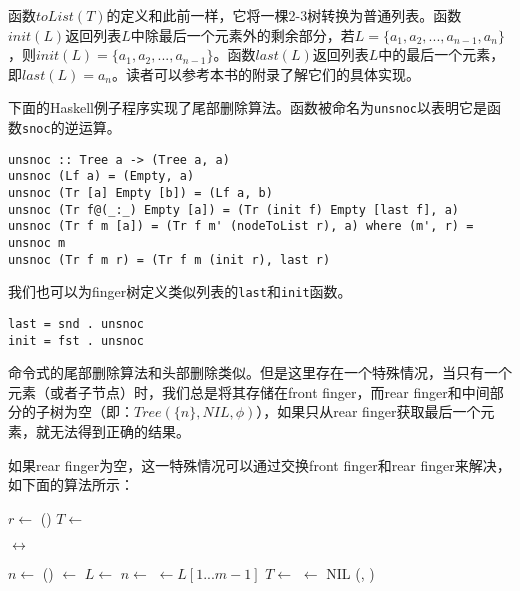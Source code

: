\documentclass[UTF8]{article}
\begin{document}
函数$toList(T)$的定义和此前一样，它将一棵2-3树转换为普通列表。函数$init(L)$返回列表$L$中除最后一个元素外的剩余部分，若$L = \{a_1, a_2, ..., a_{n-1}, a_n\}$，则$init(L) = \{a_1, a_2, ..., a_{n-1}\}$。函数$last(L)$返回列表$L$中的最后一个元素，即$last(L) = a_n$。读者可以参考本书的附录了解它们的具体实现。

下面的Haskell例子程序实现了尾部删除算法。函数被命名为\texttt{unsnoc}以表明它是函数\texttt{snoc}的逆运算。

\lstset{language=Haskell}
\begin{lstlisting}[style=Haskell]
unsnoc :: Tree a -> (Tree a, a)
unsnoc (Lf a) = (Empty, a)
unsnoc (Tr [a] Empty [b]) = (Lf a, b)
unsnoc (Tr f@(_:_) Empty [a]) = (Tr (init f) Empty [last f], a)
unsnoc (Tr f m [a]) = (Tr f m' (nodeToList r), a) where (m', r) = unsnoc m
unsnoc (Tr f m r) = (Tr f m (init r), last r)
\end{lstlisting}

我们也可以为finger树定义类似列表的\texttt{last}和\texttt{init}函数。

\begin{lstlisting}[style=Haskell]
last = snd . unsnoc
init = fst . unsnoc
\end{lstlisting}

命令式的尾部删除算法和头部删除类似。但是这里存在一个特殊情况，当只有一个元素（或者子节点）时，我们总是将其存储在front finger，而rear finger和中间部分的子树为空（即：$Tree(\{n\}, NIL, \phi)$），如果只从rear finger获取最后一个元素，就无法得到正确的结果。

如果rear finger为空，这一特殊情况可以通过交换front finger和rear finger来解决，如下面的算法所示：

\begin{algorithmic}
  \State $r \gets$ ()
  \State {}
    \State $T \gets$ 
  \EndWhile

    \State {}  $\leftrightarrow$ 
  \EndIf

  \State $n \gets $ ()
  \State {} $\gets$ 
  \Repeat
    \State $L \gets$  
    \State $n \gets$  
    \State {} $\gets L[1...m-1]$ 
    \State $T \gets $ 
      \State {} $\gets$ NIL
    \EndIf
  \State \Return (, )
\EndFunction
\end{algorithmic}
\end{document}
